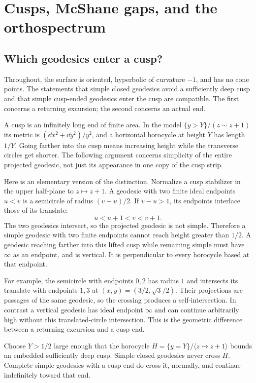 \section{Cusps, McShane gaps, and the orthospectrum}
\label{sec:cusps}

\subsection{Which geodesics enter a cusp?}

Throughout, the surface is oriented, hyperbolic of curvature $-1$, and
has no cone points. The statements that simple closed geodesics avoid a sufficiently deep cusp
and that simple cusp-ended geodesics enter the cusp are compatible. The
first concerns a returning excursion; the second concerns an actual end.

A cusp is an infinitely long end of finite area. In the model
$\{y>Y\}/(z\sim z+1)$ its metric is
$(\dd x^2+\dd y^2)/y^2$, and a horizontal horocycle at height
$Y$ has length $1/Y$. Going farther into the cusp means increasing
height while the transverse circles get shorter. The following
argument concerns simplicity of the entire projected geodesic,
not just its appearance in one copy of the cusp strip.

Here is an elementary version of the distinction. Normalize a cusp
stabilizer in the upper half-plane to $z\mapsto z+1$. A geodesic with two
finite ideal endpoints $u<v$ is a semicircle of radius $(v-u)/2$. If
$v-u>1$, its endpoints interlace those of its translate:
\[
 u<u+1<v<v+1.
\]
The two geodesics intersect, so the projected geodesic is not simple.
Therefore a simple geodesic with two finite endpoints cannot reach height
greater than $1/2$. A geodesic reaching farther into this lifted cusp
while remaining simple must have $\infty$ as an endpoint, and is vertical.
It is perpendicular to every horocycle based at that endpoint.

For example, the semicircle with endpoints $0,2$ has radius $1$
and intersects its translate with endpoints $1,3$ at
$(x,y)=(3/2,\sqrt3/2)$. Their projections are passages of
the same geodesic, so the crossing produces a self-intersection.
In contrast a vertical geodesic has ideal endpoint $\infty$
and can continue arbitrarily high without this translated-circle
intersection. This is the geometric difference between a
returning excursion and a cusp end.

Choose $Y>1/2$ large enough that the horocycle $H=\{y=Y\}/\langle z\mapsto
z+1\rangle$ bounds an embedded sufficiently deep cusp. Simple closed
geodesics never cross $H$. Complete simple geodesics with a cusp end do
cross it, normally, and continue indefinitely toward that end.

